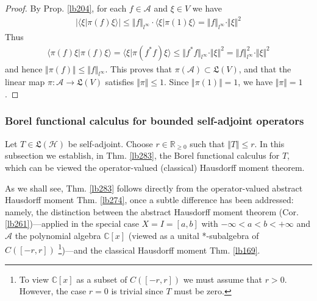 \documentclass[12pt,b5paper,notitlepage]{article}
\theoremstyle{definition}
\theoremstyle{plain}
\newcommand{\fk}{\mathfrak}
\newcommand{\bk}[1]{\langle {#1}\rangle}
\newcommand{\scr}{\mathscr}
\newcommand{\Cbb}{\mathbb C}
\newcommand{\Rbb}{\mathbb R}
\newcommand{\MH}{\mathcal H}
\newcommand{\SA}{\mathscr A}
\numberwithin{equation}{section}
\begin{document}
\begin{proof}
By Prop. \ref{lb204}, for each $f\in\scr A$ and $\xi\in V$ we have
\begin{align*}
|\bk{\xi|\pi(f)\xi}|\leq \Vert f\Vert_{l^\infty}\cdot\bk{\xi|\pi(1)\xi}=\Vert f\Vert_{l^\infty}\cdot \Vert\xi\Vert^2
\end{align*}
Thus
\begin{align*}
\bk{\pi(f)\xi|\pi(f)\xi}=\bk{\xi|\pi(f^*f)\xi}\leq \Vert f^*f\Vert_{l^\infty}\cdot \Vert\xi\Vert^2=\Vert f\Vert_{l^\infty}^2\cdot\Vert\xi\Vert^2
\end{align*}
and hence $\Vert\pi(f)\Vert\leq\Vert f\Vert_{l^\infty}$. This proves that $\pi(\SA)\subset\fk L(V)$, and that the linear map $\pi:\SA\rightarrow\fk L(V)$ satisfies $\Vert\pi\Vert\leq1$. Since $\Vert\pi(1)\Vert=1$, we have $\Vert\pi\Vert=1$.
\end{proof}



\hypertarget{proofread}{}



\subsubsection{Borel functional calculus for bounded self-adjoint operators}



Let $T\in\fk L(\MH)$ be self-adjoint. Choose $r\in\Rbb_{\geq0}$ such that $\Vert T\Vert\leq r$. In this subsection we establish, in Thm. \ref{lb283}, the Borel functional calculus for $T$, which can be viewed the operator-valued (classical) Hausdorff moment theorem.

As we shall see, Thm. \ref{lb283} follows directly from the operator-valued abstract Hausdorff moment Thm. \ref{lb274}, once a subtle difference has been addressed: namely, the distinction between the abstract Hausdorff moment theorem (Cor. \ref{lb261})---applied in the special case $X=I=[a,b]$ with $-\infty<a<b<+\infty$ and $\scr A$ the polynomial algebra $\Cbb[x]$ (viewed as a unital *-subalgebra of $C([-r,r])$ \footnote{To view $\Cbb[x]$ as a subset of $C([-r,r])$ we must assume that $r>0$. However, the case $r=0$ is trivial since $T$ must be zero.})---and the classical Hausdorff moment Thm. \ref{lb169}.
\end{document}
